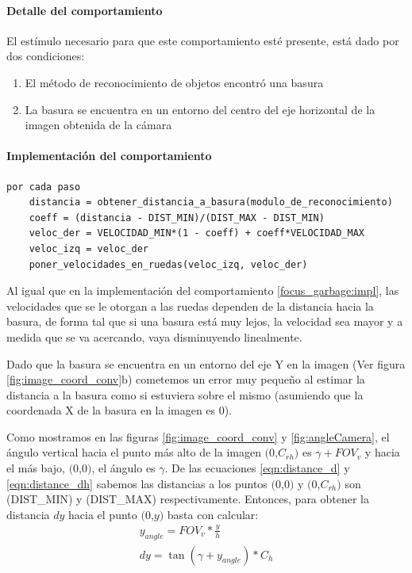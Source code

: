 \paragraph{Detalle del comportamiento}
El est\'imulo necesario para que este comportamiento est\'e presente, est\'a
dado por dos condiciones:
\begin{enumerate}
\item El m\'etodo de reconocimiento de objetos encontr\'o una basura
\item La basura se encuentra en un entorno del centro del eje horizontal de la
		imagen obtenida de la c\'amara
\end{enumerate}

\paragraph{Implementaci\'on del comportamiento}
\label{go_to_garbage:impl}
\begin{verbatim}
por cada paso
    distancia = obtener_distancia_a_basura(modulo_de_reconocimiento)
    coeff = (distancia - DIST_MIN)/(DIST_MAX - DIST_MIN)
    veloc_der = VELOCIDAD_MIN*(1 - coeff) + coeff*VELOCIDAD_MAX
    veloc_izq = veloc_der
    poner_velocidades_en_ruedas(veloc_izq, veloc_der)
\end{verbatim}

Al igual que en la implementaci\'on del comportamiento \ref{focus_garbage:impl},
las velocidades que se le otorgan a las ruedas dependen de la distancia
hacia la basura, de forma tal que si una basura est\'a muy lejos, la velocidad
sea mayor y a medida que se va acercando, vaya disminuyendo linealmente.

Dado que la basura se encuentra en un entorno del eje Y en la imagen (Ver figura
\ref{fig:image_coord_conv}b) cometemos un error muy peque\~no al estimar la
distancia a la basura como si estuviera sobre el mismo (asumiendo que la
coordenada X de la basura en la imagen es 0).

Como mostramos en las figuras \ref{fig:image_coord_conv} y
\ref{fig:angleCamera}, el \'angulo vertical hacia el punto m\'as alto de la
imagen $(0$,$C_{rh})$ es $\gamma+FOV_v$ y hacia el m\'as bajo, $(0$,$0)$, el
\'angulo es $\gamma$. De las ecuaciones \eqref{eqn:distance_d} y
\eqref{eqn:distance_dh} sabemos las distancias a los puntos $(0$,$0)$ y
$(0$,$C_{rh})$ son (DIST\_MIN) y (DIST\_MAX) respectivamente.
Entonces, para obtener la distancia $dy$ hacia el punto $(0$,$y)$ basta con
calcular:
\begin{eqnarray}
y_{angle} = FOV_v * \frac{y}{h} \\
dy = \tan(\gamma + y_{angle}) * C_h
\end{eqnarray}

